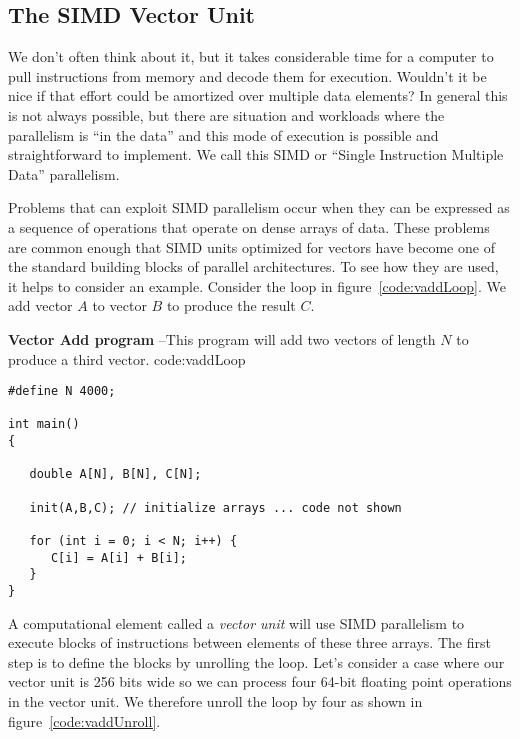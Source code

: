 \subsection{The SIMD Vector Unit}

We don't often think about it, but it takes considerable time for a computer to pull instructions from memory
and decode them for execution.  Wouldn't it be nice if that effort could be amortized over multiple data 
elements?   In general this is not always possible, but there are situation and workloads where the parallelism is ``in the data''
and this mode of execution is possible and straightforward to implement.  We call this 
SIMD or ``Single Instruction Multiple Data'' parallelism.

Problems that can exploit SIMD parallelism occur when they can be expressed as a sequence of
operations that operate on dense arrays of data.   These problems are common enough that SIMD units optimized
for vectors have become one of the standard building blocks of parallel architectures.  To see
how they are used, it helps to consider an example.  Consider the loop in figure~\ref{code:vaddLoop}.  
We add vector $A$ to vector $B$ to produce the result $C$.   


\begin{CodeExample}%
{\textbf{Vector Add program} --\small This program will add two vectors of length $N$
to produce a third vector.
}%
{code:vaddLoop}
\begin{lstlisting}
#define N 4000;

int main()
{

   double A[N], B[N], C[N];
     
   init(A,B,C); // initialize arrays ... code not shown
   
   for (int i = 0; i < N; i++) {
      C[i] = A[i] + B[i];
   }
}	  
\end{lstlisting}
\end{CodeExample}


A computational element called a \emph{vector unit}
will use SIMD parallelism to execute blocks of instructions between elements of these three arrays. The 
first step is to define the blocks by unrolling the loop.  Let's consider a case where our vector unit is 256 bits
wide so we can process four 64-bit floating point operations in the vector unit.  We therefore 
unroll the loop by four as shown in figure~\ref{code:vaddUnroll}.  

